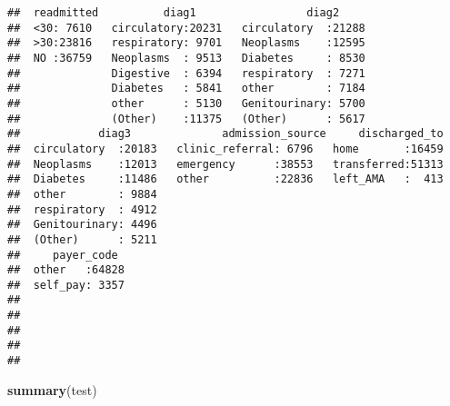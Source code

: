 \documentclass[]{article}
\newenvironment{Shaded}{\begin{snugshade}}{\end{snugshade}}
\newcommand{\KeywordTok}[1]{\textcolor[rgb]{0.13,0.29,0.53}{\textbf{#1}}}
\newcommand{\NormalTok}[1]{#1}
\begin{document}
\begin{verbatim}
##  readmitted          diag1                 diag2      
##  <30: 7610   circulatory:20231   circulatory  :21288  
##  >30:23816   respiratory: 9701   Neoplasms    :12595  
##  NO :36759   Neoplasms  : 9513   Diabetes     : 8530  
##              Digestive  : 6394   respiratory  : 7271  
##              Diabetes   : 5841   other        : 7184  
##              other      : 5130   Genitourinary: 5700  
##              (Other)    :11375   (Other)      : 5617  
##            diag3              admission_source     discharged_to  
##  circulatory  :20183   clinic_referral: 6796   home       :16459  
##  Neoplasms    :12013   emergency      :38553   transferred:51313  
##  Diabetes     :11486   other          :22836   left_AMA   :  413  
##  other        : 9884                                              
##  respiratory  : 4912                                              
##  Genitourinary: 4496                                              
##  (Other)      : 5211                                              
##     payer_code   
##  other   :64828  
##  self_pay: 3357  
##                  
##                  
##                  
##                  
## 
\end{verbatim}

\begin{Shaded}
\begin{Highlighting}[]
\KeywordTok{summary}\NormalTok{(test)}
\end{Highlighting}
\end{Shaded}
\end{document}
